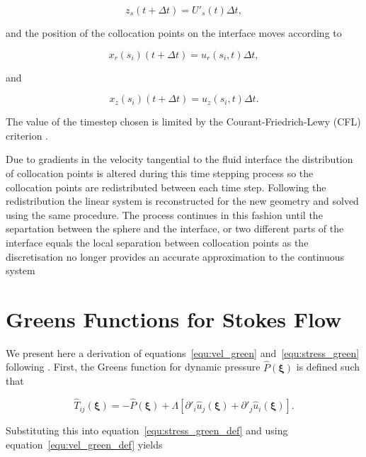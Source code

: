 \documentclass[12pt]{article}
\begin{document}
\begin{equation}
\label{equ:sphere_it}
z_{s}(t + \Delta t) = U'_{s}(t) \Delta t,
\end{equation}

and the position of the collocation points on the interface moves according to

\begin{equation}
\label{equ:int_it}
x_{r}(s_{i})(t + \Delta t) = u_{r}(s_{i},t) \Delta t,
\end{equation}

and

\begin{equation}
\label{equ:int_it}
x_{z}(s_{i})(t + \Delta t) = u_{z}(s_{i},t) \Delta t.
\end{equation}

The value of the timestep chosen is limited by the Courant-Friedrich-Lewy (CFL) criterion \citep{Courant28}.

Due to gradients in the velocity tangential to the fluid interface the distribution of collocation points is altered during this time stepping process so the collocation points are redistributed between each time step. Following the redistribution the linear system is reconstructed for the new geometry and solved using the same procedure. The process continues in this fashion until the separtation between the sphere and the interface, or two different parts of the interface equals the local separation between collocation points as the discretisation no longer provides an accurate approximation to the continuous system

\appendix

\section{Greens Functions for Stokes Flow}
\label{app:Greens}

We present here a derivation of equations~\ref{equ:vel_green} and~\ref{equ:stress_green} following \citet{Ladyzhenskaya63}. First, the Greens function for dynamic pressure $\hat{P}(\boldsymbol{\xi})$ is defined such that

\begin{equation}
\label{equ:press_green_def}
\hat{T}_{ij}(\boldsymbol{\xi}) = - \hat{P}(\boldsymbol{\xi}) + \Lambda[\partial'_{i} \hat{u}_{j}(\boldsymbol{\xi}) + \partial'_{j} \hat{u}_{i}(\boldsymbol{\xi})] .
\end{equation}


Substituting this into equation~\ref{equ:stress_green_def} and using equation~\ref{equ:vel_green_def} yields 
\end{document}
